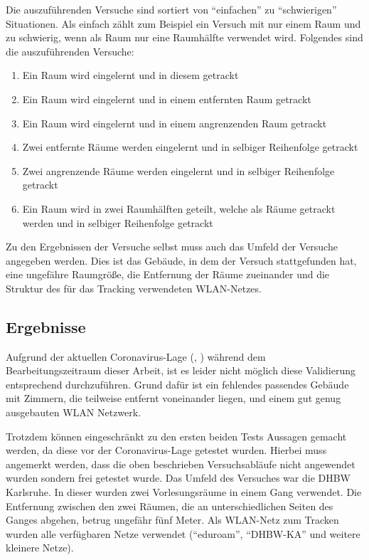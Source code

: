 Die auszuführenden Versuche sind sortiert von \enquote{einfachen} zu \enquote{schwierigen} Situationen.
Als einfach zählt zum Beispiel ein Versuch mit nur einem Raum und zu schwierig, wenn als Raum nur eine
Raumhälfte verwendet wird.
Folgendes sind die auszuführenden Versuche:
\begin{enumerate}
	\item Ein Raum wird eingelernt und in diesem getrackt
	\item Ein Raum wird eingelernt und in einem entfernten Raum getrackt
	\item Ein Raum wird eingelernt und in einem angrenzenden Raum getrackt
	\item Zwei entfernte Räume werden eingelernt und in selbiger Reihenfolge getrackt
	\item Zwei angrenzende Räume werden eingelernt und in selbiger Reihenfolge getrackt
	\item Ein Raum wird in zwei Raumhälften geteilt, welche als Räume getrackt werden und in selbiger Reihenfolge getrackt
\end{enumerate}

Zu den Ergebnissen der Versuche selbst muss auch das Umfeld der Versuche angegeben werden.
Dies ist das Gebäude, in dem der Versuch stattgefunden hat, eine ungefähre Raumgröße, die Entfernung der Räume zueinander
und die Struktur des für das Tracking verwendeten \gls{WLAN}-Netzes.

\subsection{Ergebnisse}
Aufgrund der aktuellen Coronavirus-Lage (\cite{bw2020}, \cite{dhbwka2020}) während dem Bearbeitungszeitraum dieser Arbeit,
ist es leider nicht möglich diese Validierung entsprechend durchzuführen.
Grund dafür ist ein fehlendes passendes Gebäude mit Zimmern, die teilweise entfernt voneinander liegen, und einem gut
genug ausgebauten \gls{WLAN} Netzwerk. 

Trotzdem können eingeschränkt zu den ersten beiden Tests Aussagen gemacht werden, da diese vor der Coronavirus-Lage
getestet wurden.
Hierbei muss angemerkt werden, dass die oben beschrieben Versuchsabläufe nicht angewendet wurden sondern frei getestet wurde.
Das Umfeld des Versuches war die \gls{DHBW} Karlsruhe.
In dieser wurden zwei Vorlesungsräume in einem Gang verwendet.
Die Entfernung zwischen den zwei Räumen, die an unterschiedlichen Seiten des Ganges abgehen, betrug ungefähr fünf Meter.
Als \gls{WLAN}-Netz zum Tracken wurden alle verfügbaren Netze verwendet (\enquote{eduroam}, \enquote{DHBW-KA} und weitere kleinere Netze).

